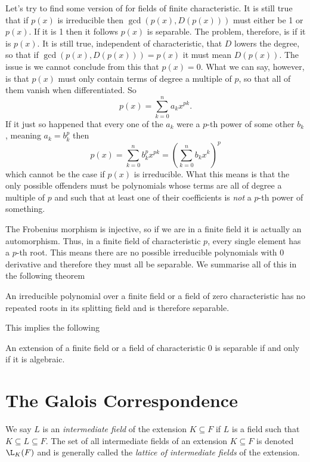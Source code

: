 \documentclass[12pt,oneside]{book}
\begin{document}
\parbreak

Let's try to find some version of 
for fields of finite characteristic. It is still true that if \( p(x) \) is irreducible
then \( \gcd(p(x), D(p(x))) \) must either be 1 or \( p(x) \). If it is 1 then it follows
\( p(x) \) is separable. The problem, therefore, is if it is \( p(x) \). It is still true,
independent of characteristic, that \( D \) lowers the degree, so that if \( \gcd(p(x),
D(p(x))) = p(x) \) it must mean \( D(p(x)) \). The issue is we cannot conclude from this
that \( p(x) = 0 \). What we can say, however, is that \( p(x) \) must only contain terms
of degree a multiple of \( p \), so that all of them vanish when differentiated. So
\begin{equation*}
	p(x) = \sum_{k = 0}^{n}a_k x^{pk}. 
\end{equation*}
If it just so happened that every one of the \( a_k \) were a \( p \)-th power of some
other \( b_k \), meaning \( a_k = b_k^p \) then
\begin{equation*}
	p(x) = \sum_{k = 0}^{n}b_k^p x^{pk} = \left(\sum_{k = 0}^{n} b_k x^k\right)^{p}  
\end{equation*}
which cannot be the case if \( p(x) \) is irreducible. What this means is that the only
possible offenders must be polynomials whose terms are all of degree a multiple of \( p \)
and such that at least one of their coefficients is \emph{not} a \( p \)-th power of
something.

The Frobenius morphism is injective, so if we are in a finite field it is actually an
automorphism. Thus, in a finite field of characteristic \( p \), every single element has
a \( p \)-th root. This means there are no possible irreducible polynomials with 0
derivative and therefore they must all be separable. We summarise all of this in the
following theorem
\begin{theorem}
	An irreducible polynomial over a finite field or a field of zero characteristic has no
	repeated roots in its splitting field and is therefore separable.
\end{theorem}
This implies the following
\begin{theorem}
	An extension of a finite field or a field of characteristic 0 is separable if and only
	if it is algebraic.
\end{theorem}


\chapter{The Galois Correspondence}
\begin{definition}
	We say \( L \) is an \emph{intermediate field} of the extension \( K \subseteq F \) if \( L \)
	is a field such that \( K \subseteq L \subseteq F \). The set of all intermediate fields
	of an extension \( K \subseteq F \) is denoted \( \L_K(F) \) and is generally called the
	\emph{lattice of intermediate fields} of the extension.
\end{definition}
\end{document}
